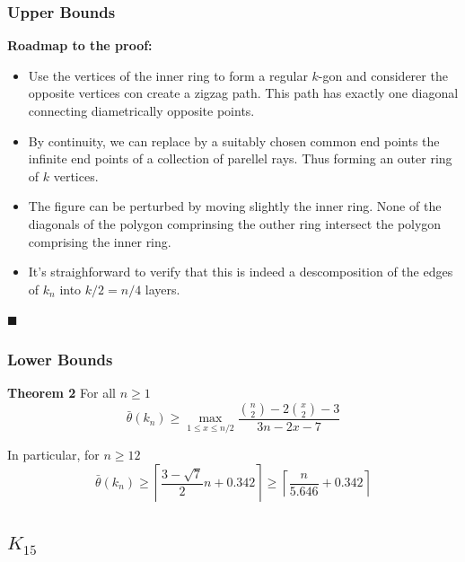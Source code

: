 \documentclass[12 pt]{beamer}
\begin{document}
\begin{frame}{}
    \frametitle{Upper Bounds}

    \textbf{Roadmap to the proof:}
    
    \begin{itemize}
        \item Use the vertices of the inner ring to form a regular $k$-gon and considerer the opposite vertices con create a zigzag path. This path has exactly one diagonal connecting diametrically opposite points. 
        
        \item By continuity, we can replace by a suitably chosen common end points the infinite end points of a collection of parellel rays. Thus forming an outer ring of $k$ vertices.
        
        \item The figure can be perturbed by moving slightly the inner ring. None of the diagonals of the polygon comprinsing the outher ring intersect the polygon comprising the inner ring.
        
        \item It's straighforward to verify that this is indeed a descomposition of the edges of $k_n$ into $k/2 = n/4$ layers.
    \end{itemize}
    
    \begin{flushright}
    $\blacksquare$
    \end{flushright}
\end{frame}


\begin{frame}{}
    \frametitle{Lower Bounds}
    
    \begin{block}{\textbf{Theorem 2}} 
    For all $n \geq 1$
    $$\bar{\theta} (k_{n}) \geq \max_{1 \leq x \leq n/2} \frac{\binom{n}{2} - 2\binom{x}{2} - 3}{3n - 2x - 7}$$
    \end{block}
    
    \pause
    
    \begin{exampleblock}{In particular, for $n \geq 12$}
    $$
    \bar{\theta} (k_{n}) \geq \left \lceil \frac{3 - \sqrt{7}}{2}n + 0.342 \right \rceil  \geq \left \lceil \frac{n}{5.646} + 0.342 \right  \rceil 
    $$
    \end{exampleblock}
\end{frame}

    \subsection{$K_{15}$}
    
\end{document}
